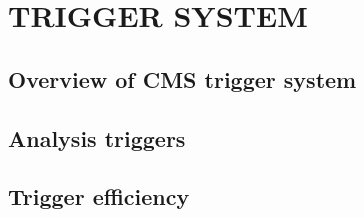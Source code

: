 \chapter{TRIGGER SYSTEM}
\label{chap:Trigger}

\section{Overview of CMS trigger system}
\label{sec:trigOverview}

\section{Analysis triggers}
\label{sec:trigRequirements}

\section{Trigger efficiency}
\label{sec:trigEff}


